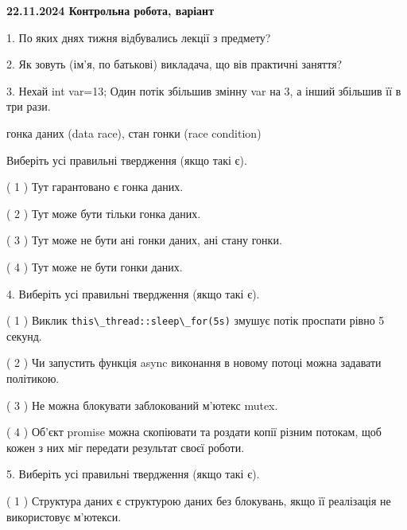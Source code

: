 \documentclass[12pt, ukrainian]{article}
\def\code#1{\Verb!#1!}
\begin{document}
\vspace{4mm}
\newpage
\begin {large}

\textbf{22.11.2024 Контрольна робота, варіант  }\par


{
1. По яких днях тижня відбувались лекції з предмету?



\vspace{5mm}
2. Як зовуть (ім'я, по батькові) викладача, що вів практичні заняття?



\vspace{5mm}
3. Нехай int var=13; Один потік збільшив змінну var на 3, а інший збільшив її в три рази.

гонка даних (data race), стан гонки (race condition)

Виберіть усі правильні твердження (якщо такі є).\par
\vspace{2mm}
( 1 ) Тут гарантовано є гонка даних.%

( 2 ) Тут може бути тільки гонка даних.%

( 3 ) Тут може не бути ані гонки даних, ані стану гонки.%

( 4 ) Тут може не бути гонки даних.%


\vspace{5mm}
4. Виберіть усі правильні твердження (якщо такі є).\par
\vspace{2mm}

( 1 ) Виклик \code{this\_thread::sleep\_for(5s)} змушує потік проспати рівно 5 секунд.%

( 2 ) Чи запустить функція  async виконання в новому потоці можна задавати політикою.%

( 3 ) Не можна блокувати заблокований м’ютекс mutex.%

( 4 ) Об’єкт promise можна скопіювати та роздати копії різним потокам, щоб кожен з них міг передати результат своєї роботи.%


\vspace{5mm}
5. Виберіть усі правильні твердження (якщо такі є).\par
\vspace{2mm}

( 1 ) Структура даних є структурою даних без блокувань, якщо її реалізація не використовує м’ютекси.%

}
\end{large}
\end{document}
